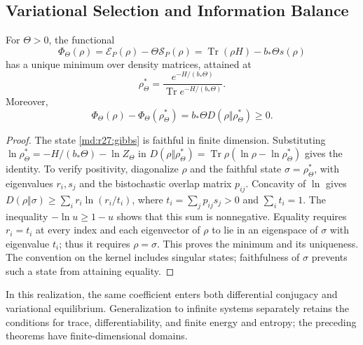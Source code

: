 \subsection{Variational Selection and Information Balance}
\begin{theorem}
For $\Theta>0$, the functional
\begin{equation}
 \Phi_\Theta(\rho)=\mathcal E_P(\rho)-\Theta\mathcal S_P(\rho)
 =\operatorname{Tr}(\rho H)-b_*\Theta s(\rho)
 \label{md:r27:funcional}
\end{equation}
has a unique minimum over density matrices, attained at
\begin{equation}
 \rho_\Theta^*=
 \frac{e^{-H/(b_*\Theta)}}{\operatorname{Tr}e^{-H/(b_*\Theta)}}.
 \label{md:r27:gibbs}
\end{equation}
Moreover,
\begin{equation}
 \Phi_\Theta(\rho)-\Phi_\Theta(\rho_\Theta^*)
 =b_*\Theta D(\rho\Vert\rho_\Theta^*)\ge0.
 \label{md:r27:variacional}
\end{equation}
\end{theorem}
\begin{proof}
The state \eqref{md:r27:gibbs} is faithful in finite dimension.
Substituting $\ln\rho_\Theta^*=-H/(b_*\Theta)-\ln Z_\Theta$ in
$D(\rho\Vert\rho_\Theta^*)=\operatorname{Tr}\rho(\ln\rho-\ln\rho_\Theta^*)$
gives the identity. To verify positivity, diagonalize $\rho$ and the faithful
state $\sigma=\rho_\Theta^*$, with eigenvalues $r_i,s_j$ and the bistochastic
overlap matrix $p_{ij}$. Concavity of $\ln$ gives
$D(\rho\Vert\sigma)\ge\sum_i r_i\ln(r_i/t_i)$,
where $t_i=\sum_jp_{ij}s_j>0$ and $\sum_i t_i=1$.
The inequality $-\ln u\ge1-u$ shows that this sum is nonnegative.
Equality requires $r_i=t_i$ at every index and each eigenvector of $\rho$
to lie in an eigenspace of $\sigma$ with eigenvalue $t_i$;
thus it requires $\rho=\sigma$. This proves the minimum and its uniqueness.
The convention on the kernel includes singular states; faithfulness of
$\sigma$ prevents such a state from attaining equality.
\end{proof}
In this realization, the same coefficient enters both differential conjugacy
and variational equilibrium. Generalization to infinite systems separately
retains the conditions for trace, differentiability, and finite energy and
entropy; the preceding theorems have finite-dimensional domains.


